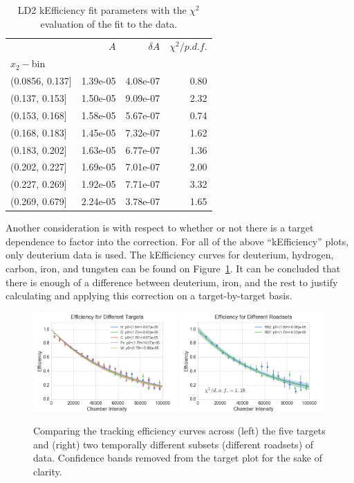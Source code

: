 \begin{table}
	\centering
	\begin{tabular}{lrrr}
		\toprule
		{} &        $A$ &        $\delta A$ &  $\chi^2/p.d.f.$ \\
		$x_2-$bin              &           &               &            \\
		\midrule
		(0.0856, 0.137] &  1.39e-05 &  4.08e-07 &   0.80 \\
		(0.137, 0.153]  &  1.50e-05 &  9.09e-07 &   2.32 \\
		(0.153, 0.168]  &  1.58e-05 &  5.67e-07 &   0.74 \\
		(0.168, 0.183]  &  1.45e-05 &  7.32e-07 &   1.62 \\
		(0.183, 0.202]  &  1.63e-05 &  6.77e-07 &   1.36 \\
		(0.202, 0.227]  &  1.69e-05 &  7.01e-07 &   2.00 \\
		(0.227, 0.269]  &  1.92e-05 &  7.71e-07 &   3.32 \\
		(0.269, 0.679]  &  2.24e-05 &  3.78e-07 &   1.65 \\
		\bottomrule
	\end{tabular}
	\caption{LD2 kEfficiency fit parameters with the $\chi^2$ evaluation of the fit to the data.}
	\label{tab:keff-ld2-fits}
\end{table}
Another consideration is with respect to whether or not there is a target dependence to factor into the correction. For all of the above ``kEfficiency'' plots, only deuterium data is used. The kEfficiency curves for deuterium, hydrogen, carbon, iron, and tungsten can be found on Figure~\ref{fig:keff-target-roadset}. It can be concluded that there is enough of a difference between deuterium, iron, and the rest to justify calculating and applying this correction on a target-by-target basis.
\begin{figure}
	\centering
	\includegraphics[width=0.49\textwidth]{figures/analysis/target-keff-int.png}
	\includegraphics[width=0.49\textwidth]{figures/analysis/roadset-keff-int.png}
	\caption{Comparing the tracking efficiency curves across (left) the five targets and (right) two temporally different subsets (different roadsets) of data. Confidence bands removed from the target plot for the sake of clarity.}
	\label{fig:keff-target-roadset}
\end{figure}

